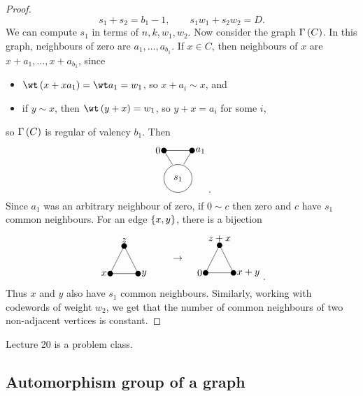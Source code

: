 \begin{proof}
$$ s_1 + s_2 = b_1 - 1, \qquad s_1w_1 + s_2w_2 = D. $$
We can compute $ s_1 $ in terms of $ n, k, w_1, w_2 $. Now consider the graph $ \Gamma\br{C} $. In this graph, neighbours of zero are $ a_1, \dots, a_{b_1} $. If $ x \in C $, then neighbours of $ x $ are $ x + a_1, \dots, x + a_{b_1} $, since
\begin{itemize}
\item $ \wt \br{x + xa_1} = \wt a_1 = w_1 $, so $ x + a_i \sim x $, and
\item if $ y \sim x $, then $ \wt \br{y + x} = w_1 $, so $ y + x = a_i $ for some $ i $,
\end{itemize}
so $ \Gamma\br{C} $ is regular of valency $ b_1 $. Then
$$
\begin{tikzpicture}
\fill (0, 0) circle (0.1) node[left]{$ 0 $};
\fill (1, 0) circle (0.1) node[right]{$ a_1 $};
\draw (0.5, -1) circle (0.5) node{$ s_1 $};
\draw (0, 0) to (1, 0);
\draw (0, 0) to (0.3, -0.5);
\draw (1, 0) to (0.7, -0.5);
\end{tikzpicture}.
$$
Since $ a_1 $ was an arbitrary neighbour of zero, if $ 0 \sim c $ then zero and $ c $ have $ s_1 $ common neighbours. For an edge $ \cbr{x, y} $, there is a bijection
$$
\begin{tikzpicture}
\fill (0, 0) circle (0.1) node[above]{$ z $};
\fill (-0.5, -1) circle (0.1) node[left]{$ x $};
\fill (0.5, -1) circle (0.1) node[right]{$ y $};
\draw (0, 0) to (-0.5, -1);
\draw (0, 0) to (0.5, -1);
\draw (-0.5, -1) to (0.5, -1);
\end{tikzpicture}
\qquad
\begin{tikzpicture}
\draw (-1.5, -0.5) node{$ \to $};
\fill (0, 0) circle (0.1) node[above]{$ z + x $};
\fill (-0.5, -1) circle (0.1) node[left]{$ 0 $};
\fill (0.5, -1) circle (0.1) node[right]{$ x + y $};
\draw (0, 0) to (-0.5, -1);
\draw (0, 0) to (0.5, -1);
\draw (-0.5, -1) to (0.5, -1);
\end{tikzpicture}.
$$
Thus $ x $ and $ y $ also have $ s_1 $ common neighbours. Similarly, working with codewords of weight $ w_2 $, we get that the number of common neighbours of two non-adjacent vertices is constant.
\end{proof}


Lecture 20 is a problem class.

\pagebreak

\subsection{Automorphism group of a graph}

